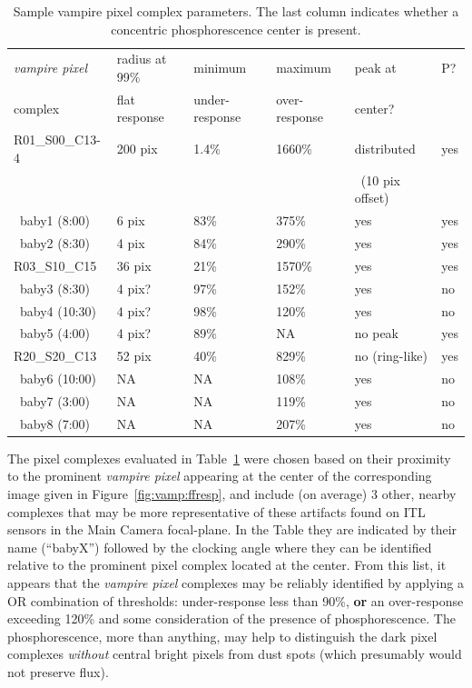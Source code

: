 \begin{table}[ht!]
\caption{Sample vampire pixel complex parameters. The last column indicates whether a concentric phosphorescence center is present.}
\label{tab:vamp:samples}
\centering
\begin{tabular}{llllll}
\toprule
{\it vampire pixel}& radius at 99\% & minimum& maximum& peak at & P?\\
complex & flat response & under-response & over-response & center?\\
\midrule
R01\_S00\_C13-4 & 200 pix & 1.4\%&1660\% & distributed & yes\\
                &         &      &       &~(10 pix offset)&\\
~baby1 (8:00)   & 6 pix   & 83\% & 375\% & yes & yes \\
~baby2 (8:30)   & 4 pix   & 84\% & 290\% & yes & yes \\
R03\_S10\_C15   & 36 pix  & 21\% & 1570\%& yes & yes \\
~baby3 (8:30)   & 4 pix?  & 97\% & 152\% & yes & no \\
~baby4 (10:30)  & 4 pix?  & 98\% & 120\% & yes & no \\
~baby5 (4:00)   & 4 pix?  & 89\% & NA    & no peak & yes \\
R20\_S20\_C13   & 52 pix  & 40\% & 829\% & no (ring-like) & yes \\
~baby6 (10:00)  & NA      & NA   & 108\% & yes & no \\
~baby7 (3:00)   & NA      & NA   & 119\% & yes & no \\
~baby8 (7:00)   & NA      & NA   & 207\% & yes & no \\
\bottomrule
\end{tabular}
\end{table}


The pixel complexes evaluated in Table~\ref{tab:vamp:samples} were chosen based on their proximity to the prominent {\it vampire pixel} appearing at the center of the corresponding image given in Figure~\ref{fig:vamp:ffresp}, and include (on average) 3 other, nearby complexes that may be more representative of these artifacts found on ITL sensors in the Main Camera focal-plane. In the Table they are indicated by their name (``babyX'') followed by the clocking angle where they can be identified relative to the prominent pixel complex located at the center. From this list, it appears that the {\it vampire pixel} complexes may be reliably identified by applying a OR combination of thresholds: under-response less than 90\%, {\bf or} an over-response exceeding 120\% and some consideration of the presence of phosphorescence. The phosphorescence, more than anything, may help to distinguish the dark pixel complexes {\it without} central bright pixels from dust spots (which presumably would not preserve flux). 

